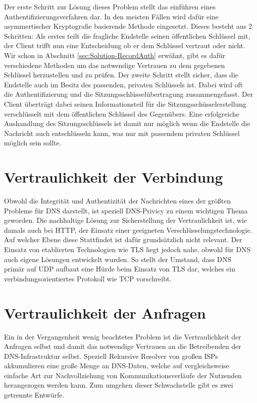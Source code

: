 Der erste Schritt zur Lösung dieses Problem stellt das einführen eines Authentifizierungsverfahren dar. In den meisten Fällen wird dafür eine asymmertischer Kryptografie basierende Methode eingesetzt. Dieses besteht aus 2 Schritten: Als erstes teilt die fragliche Endstelle seinen öffentlichen Schlüssel mit, der Client trifft nun eine Entscheidung ob er dem Schlüssel vertraut oder nicht. Wir schon in Abschnitt \ref{sec:Solution-RecordAuth} erwähnt, gibt es dafür verschiedene Methoden um das notwendige Vertrauen zu dem gegebenen Schlüssel herzustellen und zu prüfen. Der zweite Schritt stellt sicher, dass die Endstelle auch im Besitz des passenden, privaten Schlüssels ist. Dabei wird oft die Authentifizierung und die Sitzungsschlüsselübertragung zusammengefasst. Der Client überträgt dabei seinen Informationsteil für die Sitzungsschüsselerstellung verschlüsselt mit dem öffentlichen Schlüssel des Gegenübers. Eine erfolgreiche Aushandlung des Sitzungsschlüssels ist damit nur möglich wenn die Endstelle die Nachricht auch entschlüsseln kann, was nur mit passendem privaten Schlüssel möglich sein sollte. 

\section{Vertraulichkeit der Verbindung}

Obwohl die Integrität und Authentizität der Nachrichten eines der größten Probleme für DNS darstellt, ist speziell DNS-Privicy zu einem wichtigen Thema geworden. Die nachhaltige Lösung zur Sicherstellung der Vertraulichkeit ist, wie damals auch bei HTTP, der Einsatz einer geeigneten Verschlüsselungstechnologie. Auf welcher Ebene diese Stattfindet ist dafür grundsätzlich nicht relevant. Der Einsatz von etablierten Technologien wie TLS liegt jedoch nahe, obwohl für DNS auch eigene Lösungen entwickelt wurden. So stellt der Umstand, dass DNS primär auf UDP aufbaut eine Hürde beim Einsatz von TLS dar, welches ein verbindungsorientiertes Protokoll wie TCP vorschreibt.

\section{Vertraulichkeit der Anfragen}

Ein in der Vergangenheit wenig beachtetes Problem ist die Vertraulichkeit der Anfragen selbst und damit das notwendige Vertrauen an die Betreibenden der DNS-Infrastruktur selbst. Speziell Rekursive Resolver von großen ISPs akkumulieren eine große Menge an DNS-Daten, welche auf vergleichsweise einfache Art zur Nachvollziehung von Kommunikationsverläufe der Nutzenden herangezogen werden kann. Zum umgehen dieser Schwachstelle gibt es zwei getrennte Entwürfe.

